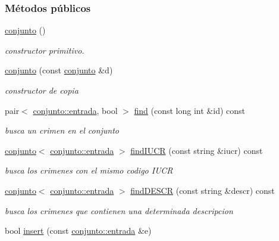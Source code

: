 \subsubsection*{Métodos públicos}
\begin{DoxyCompactItemize}
\item 
\hyperlink{classconjunto_a16d987f42c679efab01748178ba45891}{conjunto} ()
\begin{DoxyCompactList}\small\item\em constructor primitivo. \end{DoxyCompactList}\item 
\hyperlink{classconjunto_ab0944b1f9a0c959ca314ce0debd5def9}{conjunto} (const \hyperlink{classconjunto}{conjunto} \&d)
\begin{DoxyCompactList}\small\item\em constructor de copia \end{DoxyCompactList}\item 
pair$<$ \hyperlink{classconjunto_a09cad766dd65de73e51eae21f9d22585}{conjunto\-::entrada}, bool $>$ \hyperlink{classconjunto_a64ee1c67331bce15dc029048631dda97}{find} (const long int \&id) const 
\begin{DoxyCompactList}\small\item\em busca un crimen en el conjunto \end{DoxyCompactList}\item 
\hyperlink{classconjunto}{conjunto}$<$ \hyperlink{classconjunto_a09cad766dd65de73e51eae21f9d22585}{conjunto\-::entrada} $>$ \hyperlink{classconjunto_a50eb93f152dc973726d184733d7ecd98}{find\-I\-U\-C\-R} (const string \&iucr) const 
\begin{DoxyCompactList}\small\item\em busca los crimenes con el mismo codigo I\-U\-C\-R \end{DoxyCompactList}\item 
\hyperlink{classconjunto}{conjunto}$<$ \hyperlink{classconjunto_a09cad766dd65de73e51eae21f9d22585}{conjunto\-::entrada} $>$ \hyperlink{classconjunto_a5190c59db573008cc48a8ce734954a96}{find\-D\-E\-S\-C\-R} (const string \&descr) const 
\begin{DoxyCompactList}\small\item\em busca los crimenes que contienen una determinada descripcion \end{DoxyCompactList}\item 
bool \hyperlink{classconjunto_aa65b9f7c4cb9bad6d4e40c1973095930}{insert} (const \hyperlink{classconjunto_a09cad766dd65de73e51eae21f9d22585}{conjunto\-::entrada} \&e)

\end{DoxyCompactItemize}
